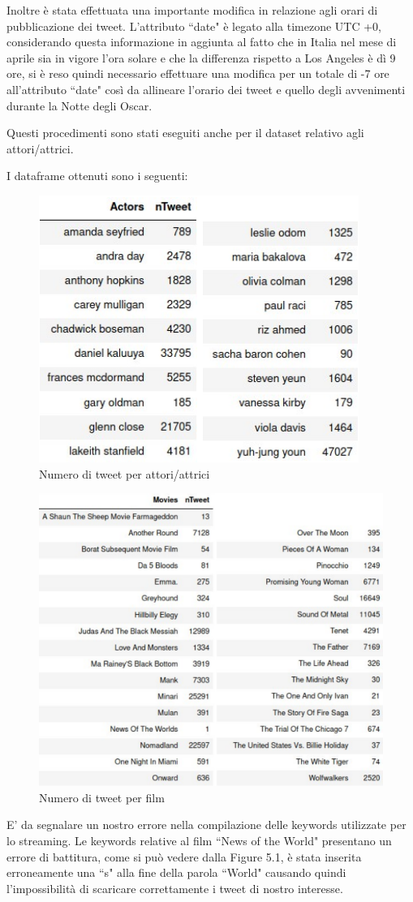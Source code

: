 \documentclass[11pt,a4paper]{report}
\begin{document}
Inoltre è stata effettuata una importante modifica in relazione agli orari di pubblicazione dei tweet. L'attributo “date" è legato alla timezone UTC +0, considerando questa informazione in aggiunta al fatto che in Italia nel mese di aprile sia in vigore l'ora solare e che la differenza rispetto a Los Angeles è dì 9 ore, si è reso quindi necessario effettuare una modifica per un totale di -7 ore all'attributo “date" così da allineare l'orario dei tweet e quello degli avvenimenti durante la Notte degli Oscar.

Questi procedimenti sono stati eseguiti anche per il dataset relativo agli attori/attrici.

I dataframe ottenuti sono i seguenti:

	\begin{figure}[h]
			\centering
			\includegraphics[width=0.30\linewidth]{imgs/actrs.png}
			\caption{Numero di tweet per attori/attrici}
			\label{fig:Prima infografica}
		\end{figure}

	\begin{figure}[h]
			\centering
			\includegraphics[width=0.40\linewidth]{imgs/movies.png}
			\caption{Numero di tweet per film}
			\label{fig:Prima infografica}
		\end{figure}

\newpage		
E' da segnalare un nostro errore nella compilazione delle keywords utilizzate per lo streaming. Le keywords relative al film “News of the World" presentano un errore di battitura, come si può vedere dalla Figure 5.1, è stata inserita erroneamente una “s" alla fine della parola “World" causando quindi l'impossibilità di scaricare correttamente i tweet di nostro interesse.
\end{document}
